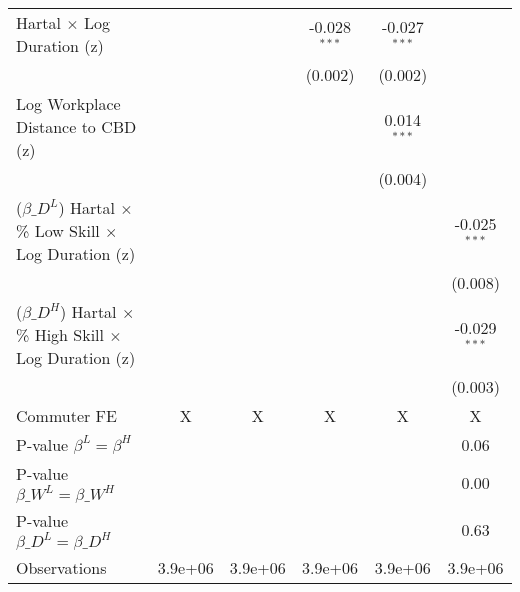{\begin{tabular}{l*{5}{c}}
\addlinespace
\quad Hartal $\times$ Log Duration (z)&                    &                    &      -0.028$^{***}$&      -0.027$^{***}$&                    \\
            &                    &                    &     (0.002)        &     (0.002)        &                    \\
\addlinespace
\quad Log Workplace Distance to CBD (z) &                    &                    &                    &       0.014$^{***}$&                    \\
            &                    &                    &                    &     (0.004)        &                    \\
\addlinespace
\quad ($\beta\_D^L$) Hartal $\times$ \% Low Skill $\times$ Log Duration (z) &                    &                    &                    &                    &      -0.025$^{***}$\\
            &                    &                    &                    &                    &     (0.008)        \\
\addlinespace
\quad ($\beta\_D^H$) Hartal $\times$ \% High Skill $\times$ Log Duration (z) &                    &                    &                    &                    &      -0.029$^{***}$\\
            &                    &                    &                    &                    &     (0.003)        \\
\midrule
Commuter FE &           X        &           X        &           X        &           X        &           X        \\
P-value $\beta^L=\beta^H$&                    &                    &                    &                    &        0.06        \\
P-value $\beta\_W^L=\beta\_W^H$&                    &                    &                    &                    &        0.00        \\
P-value $\beta\_D^L=\beta\_D^H$&                    &                    &                    &                    &        0.63        \\
Observations&     3.9e+06        &     3.9e+06        &     3.9e+06        &     3.9e+06        &     3.9e+06        \\
\bottomrule
\end{tabular}
}
